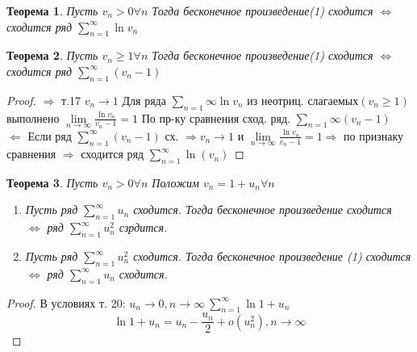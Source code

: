 \documentclass[12pt, oneside]{article}
\theoremstyle{plain}
\newtheorem{Theorem}{Теорема}
\begin{document}
	\begin{Theorem}
		Пусть $v_{n} > 0 \forall n$ Тогда бесконечное произведение(1) сходится
		$\Leftrightarrow$ сходится ряд $\sum\limits_{n = 1}^{\infty}\ln{v_n}$
	\end{Theorem}

	\begin{Theorem}
		Пусть $v_{n} \geq 1 \forall n$ Тогда бесконечное произведение(1) сходится
		$\Leftrightarrow$ сходится ряд $\sum\limits_{n = 1}^{\infty}(v_{n} - 1)$
	\end{Theorem}
	\begin{proof}
		$\Rightarrow$ {т.17} $v_{n} \to 1$ Для ряда $\sum\limits_{n = 1}{\infty}\ln{v_n}$
		из неотриц. слагаемых$(v_{n} \geq 1)$ выполнено $\lim\limits_{n\to\infty}\frac{\ln{v_n}}{v_{n}-1}
		= 1$ По пр-ку сравнения сход. ряд. $\sum\limits_{n=1}{\infty}(v_{n} - 1)$ \\
		$\Leftarrow$ Если ряд $\sum\limits_{n = 1}^{\infty}(v_{n} - 1)$ сх.
		$\Rightarrow v_{n} \to 1$ и
		$\lim\limits_{n \to \infty}\frac{\ln{v_n}}{v_{n} - 1}= 1 \Rightarrow$ по
		признаку сравнения $\Rightarrow$ сходится ряд
		$\sum\limits_{n = 1}^{\infty}\ln(v_{n})$
	\end{proof}
	\begin{Theorem}
		Пусть $v_{n} > 0 \forall n$ Положим $v_{n} = 1 + u_{n} \forall n$
		\begin{enumerate}
			\item Пусть ряд $\sum\limits_{n=1}^{\infty}u_{n}$ сходится. Тогда
				бесконечное произведение сходится $\Leftrightarrow$ ряд
				$\sum\limits_{n = 1}^{\infty}u_{n}^{2}$ сзрдится.

			\item Пусть ряд $\sum\limits_{n = 1}^{\infty}u^{2}_{n}$ сходится. Тогда
				бесконечное произведение (1) сходится $\Leftrightarrow$ ряд
				$\sum\limits_{n = 1}^{\infty}u_{n}$ сходится.
		\end{enumerate}
	\end{Theorem}
	\begin{proof}
		В условиях т. 20: $u_{n} \to 0, n \to \infty \ \sum\limits_{n = 1}^{\infty}\ln
		{1 + u_n}$
		\[
			\ln{1 + u_n}= u_{n} - \frac{u_{n}}{2}+ o(u^{2}_{n}), n\to\infty
		\]
	\end{proof}
\end{document}
